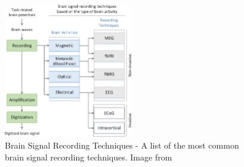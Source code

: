 \begin{figure}[htbp!]
    \centering
    \includegraphics[width=0.5\textwidth]{Figures/Related/brain_signal_recording_techniques}
    \caption{Brain Signal Recording Techniques - A list of the most common brain signal recording techniques. Image from~\cite{altaheri2023deep}}
\end{figure}
